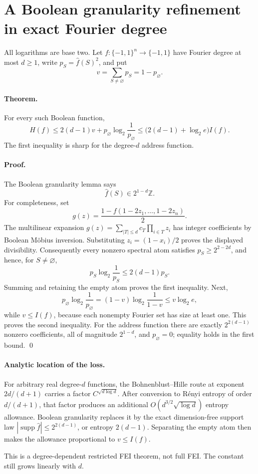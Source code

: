 \section*{A Boolean granularity refinement in exact Fourier degree}

All logarithms are base two.  Let
\(f:\{-1,1\}^n\to\{-1,1\}\) have Fourier degree at most \(d\geq1\),
write \(p_S=\widehat f(S)^2\), and put
\[
 v=\sum_{S\ne\varnothing}p_S=1-p_\varnothing.
\]

\paragraph{Theorem.}
For every such Boolean function,
\[
 \boxed{\quad
 H(f)\leq 2(d-1)v+p_\varnothing\log_2\frac1{p_\varnothing}
 \leq \bigl(2(d-1)+\log_2 e\bigr)I(f).
 \quad}
\]
The first inequality is sharp for the degree-\(d\) address function.

\paragraph{Proof.}
The Boolean granularity lemma says
\[
 \widehat f(S)\in 2^{1-d}\mathbb Z.
\]
For completeness, set
\[
 g(z)=\frac{1-f(1-2z_1,\ldots,1-2z_n)}2.
\]
The multilinear expansion
\(g(z)=\sum_{|T|\leq d}c_T\prod_{i\in T}z_i\) has integer
coefficients by Boolean M\"obius inversion.  Substituting
\(z_i=(1-x_i)/2\) proves the displayed divisibility.
Consequently every nonzero spectral atom satisfies
\(p_S\geq2^{2-2d}\), and hence, for \(S\ne\varnothing\),
\[
 p_S\log_2\frac1{p_S}\leq 2(d-1)p_S.
\]
Summing and retaining the empty atom proves the first inequality.  Next,
\[
 p_\varnothing\log_2\frac1{p_\varnothing}
 =(1-v)\log_2\frac1{1-v}\leq v\log_2e,
\]
while \(v\leq I(f)\), because each nonempty Fourier set has size at
least one.  This proves the second inequality.  For the address function
there are exactly \(2^{2(d-1)}\) nonzero coefficients, all of magnitude
\(2^{1-d}\), and \(p_\varnothing=0\); equality holds in the first bound.
\qed

\paragraph{Analytic location of the loss.}
For arbitrary real degree-\(d\) functions, the Bohnenblust--Hille route
at exponent \(2d/(d+1)\) carries a factor
\(C^{\sqrt{d\log d}}\).  After conversion to R\'enyi entropy of order
\(d/(d+1)\), that factor produces an additional
\(O(d^{3/2}\sqrt{\log d})\) entropy allowance.  Boolean granularity
replaces it by the exact dimension-free support law
\(|\operatorname{supp}\widehat f|\leq2^{2(d-1)}\), or entropy
\(2(d-1)\).  Separating the empty atom then makes the allowance
proportional to \(v\leq I(f)\).

This is a degree-dependent restricted FEI theorem, not full FEI.  The
constant still grows linearly with \(d\).
